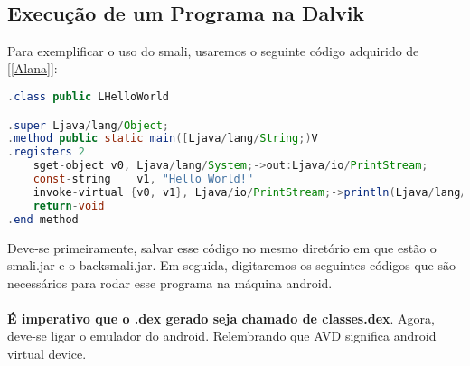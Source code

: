 \documentclass[hidelinks,12pt]{article}
\begin{document}
	\noindent{}\\	

	\subsection{Execução de um Programa na Dalvik}
	
	Para exemplificar o uso do smali, usaremos o seguinte código adquirido de [\ref{Alana}]:\\
	



\begin{lstlisting}[caption=Smali,language=java]
.class public LHelloWorld

.super Ljava/lang/Object;
.method public static main([Ljava/lang/String;)V
.registers 2
	sget-object v0, Ljava/lang/System;->out:Ljava/io/PrintStream;
	const-string	v1, "Hello World!"
	invoke-virtual {v0, v1}, Ljava/io/PrintStream;->println(Ljava/lang/String;)V
	return-void
.end method
\end{lstlisting}
	
	Deve-se primeiramente, salvar esse código no mesmo diretório em que estão o smali.jar e o backsmali.jar. Em seguida, digitaremos os seguintes códigos que são necessários para rodar esse programa na máquina android.\\

\noindent{}\\		
	
	\textbf{É imperativo que o .dex gerado seja chamado de classes.dex}.
	Agora, deve-se ligar o emulador do android. Relembrando que AVD significa android virtual device.\\
	
	\noindent{}\\	
\end{document}
